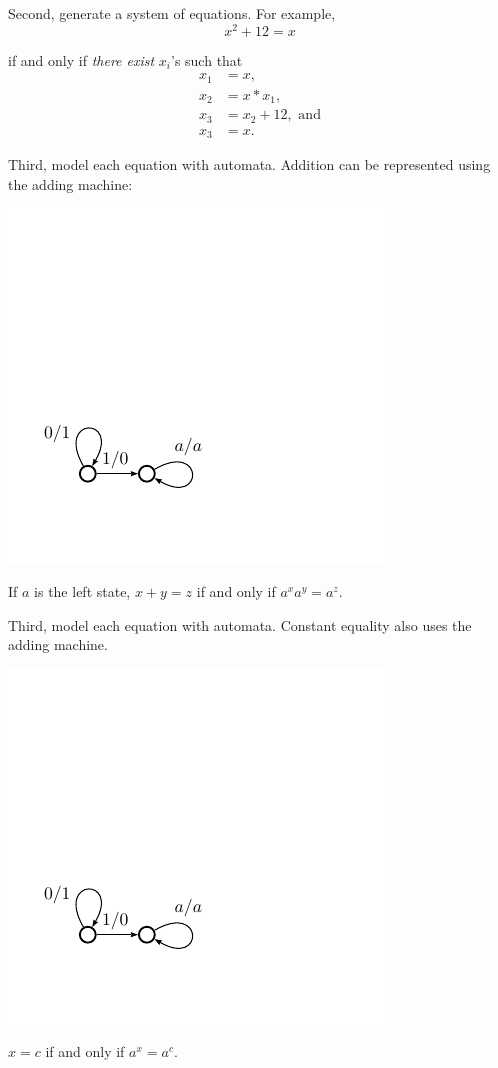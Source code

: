 \documentclass{beamer}
\begin{document}
\begin{frame}{Second, generate a system of equations.}
  For example,
  \[ x^2 + 12 = x \]

  if and only if \emph{there exist} $x_i$'s such that
  \begin{align*}
    x_1 &= x, \\
    x_2 &= x * x_1, \\
    x_3 &= x_2 + 12, \text{ and} \\
    x_3 &= x.
  \end{align*}
  
\end{frame}

\begin{frame}{Third, model each equation with automata.} 
  Addition can be represented using the adding machine:
  \begin{center}
    \includegraphics[scale=0.5]{../figures/adder}
  \end{center}
  If $a$ is the left state, $x + y = z$ if and only if
  $a^x a^y = a^z$.
\end{frame}

\begin{frame}{Third, model each equation with automata.} 
  Constant equality also uses the adding machine.
  \begin{center}
    \includegraphics[scale=0.5]{../figures/adder}
  \end{center}
  $x = c$ if and only if $a^x= a^c$.
\end{frame}
\end{document}
